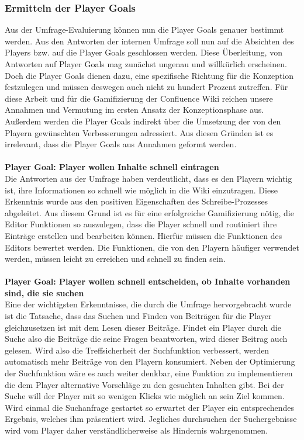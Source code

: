\documentclass[a4paper,12pt,twoside]{scrartcl}
\begin{document}
\subsubsection{Ermitteln der Player Goals}
\label{Player}
Aus der Umfrage-Evaluierung können nun die Player Goals genauer bestimmt werden. Aus den Antworten der internen Umfrage soll nun auf die Absichten des Players bzw. auf die Player Goals geschlossen werden. Diese Überleitung, von Antworten auf Player Goals mag zunächst ungenau und willkürlich erscheinen. Doch die Player Goals dienen dazu, eine spezifische Richtung für die Konzeption festzulegen und müssen deswegen auch nicht zu hundert Prozent zutreffen. Für diese Arbeit und für die Gamifizierung der Confluence Wiki reichen unsere Annahmen und Vermutung im ersten Ansatz der Konzeptionsphase aus. Außerdem werden die Player Goals indirekt über die Umsetzung der von den Playern gewünschten Verbesserungen adressiert. Aus diesen Gründen ist es irrelevant, dass die Player Goals aus Annahmen geformt werden.
\\\\
\textbf{Player Goal: Player wollen Inhalte schnell eintragen}\\
Die Antworten aus der Umfrage haben verdeutlicht, dass es den Playern wichtig ist, ihre Informationen so schnell wie möglich in die Wiki einzutragen. Diese Erkenntnis wurde aus den positiven Eigenschaften des Schreibe-Prozesses abgeleitet. Aus diesem Grund ist es für eine erfolgreiche Gamifizierung nötig, die Editor Funktionen so auszulegen, dass die Player schnell und routiniert ihre Einträge erstellen und bearbeiten können. Hierfür müssen die Funktionen des Editors bewertet werden. Die Funktionen, die von den Playern häufiger verwendet werden, müssen leicht zu erreichen und schnell zu finden sein.
\\\\
\textbf{Player Goal: Player wollen schnell entscheiden, ob Inhalte vorhanden sind, die sie suchen}\\
Eine der wichtigsten Erkenntnisse, die durch die Umfrage hervorgebracht wurde ist die Tatsache, dass das Suchen und Finden von Beiträgen für die Player gleichzusetzen ist mit dem Lesen dieser Beiträge. Findet ein Player durch die Suche also die Beiträge die seine Fragen beantworten, wird dieser Beitrag auch gelesen. Wird also die Treffsicherheit der Suchfunktion verbessert, werden automatisch mehr Beiträge von den Playern konsumiert. Neben der Optimierung der Suchfunktion wäre es auch weiter denkbar, eine Funktion zu implementieren die dem Player alternative Vorschläge zu den gesuchten Inhalten gibt. Bei der Suche will der Player mit so wenigen Klicks wie möglich an sein Ziel kommen. Wird einmal die Suchanfrage gestartet so erwartet der Player ein entsprechendes Ergebnis, welches ihm präsentiert wird. Jegliches durchsuchen der Suchergebnisse wird vom Player daher verständlicherweise als Hindernis wahrgenommen.
\end{document}
